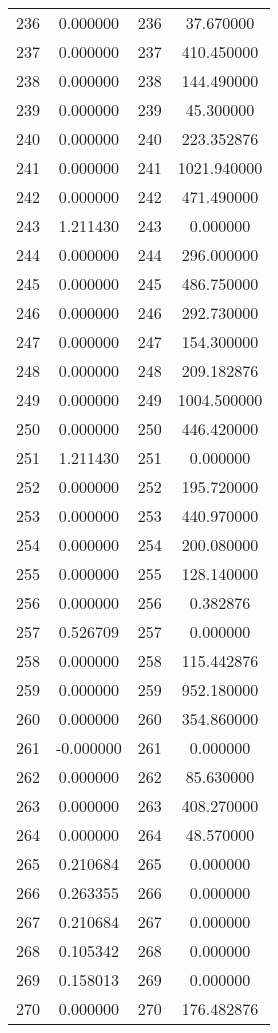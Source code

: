 \documentclass[12pt]{article}
\begin{document}
\begin{longtable}{@{}cccc@{}}
236 & 0.000000 & 236 & 37.670000 \\
237 & 0.000000 & 237 & 410.450000 \\
238 & 0.000000 & 238 & 144.490000 \\
239 & 0.000000 & 239 & 45.300000 \\
240 & 0.000000 & 240 & 223.352876 \\
241 & 0.000000 & 241 & 1021.940000 \\
242 & 0.000000 & 242 & 471.490000 \\
243 & 1.211430 & 243 & 0.000000 \\
244 & 0.000000 & 244 & 296.000000 \\
245 & 0.000000 & 245 & 486.750000 \\
246 & 0.000000 & 246 & 292.730000 \\
247 & 0.000000 & 247 & 154.300000 \\
248 & 0.000000 & 248 & 209.182876 \\
249 & 0.000000 & 249 & 1004.500000 \\
250 & 0.000000 & 250 & 446.420000 \\
251 & 1.211430 & 251 & 0.000000 \\
252 & 0.000000 & 252 & 195.720000 \\
253 & 0.000000 & 253 & 440.970000 \\
254 & 0.000000 & 254 & 200.080000 \\
255 & 0.000000 & 255 & 128.140000 \\
256 & 0.000000 & 256 & 0.382876 \\
257 & 0.526709 & 257 & 0.000000 \\
258 & 0.000000 & 258 & 115.442876 \\
259 & 0.000000 & 259 & 952.180000 \\
260 & 0.000000 & 260 & 354.860000 \\
261 & -0.000000 & 261 & 0.000000 \\
262 & 0.000000 & 262 & 85.630000 \\
263 & 0.000000 & 263 & 408.270000 \\
264 & 0.000000 & 264 & 48.570000 \\
265 & 0.210684 & 265 & 0.000000 \\
266 & 0.263355 & 266 & 0.000000 \\
267 & 0.210684 & 267 & 0.000000 \\
268 & 0.105342 & 268 & 0.000000 \\
269 & 0.158013 & 269 & 0.000000 \\
270 & 0.000000 & 270 & 176.482876 \\

\end{longtable}
\end{document}
